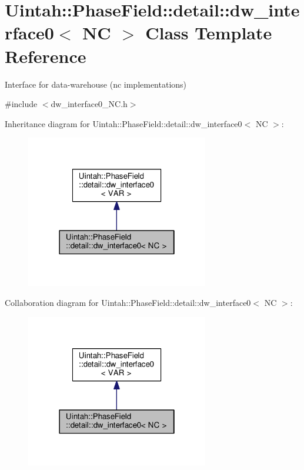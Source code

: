 \hypertarget{classUintah_1_1PhaseField_1_1detail_1_1dw__interface0_3_01NC_01_4}{}\section{Uintah\+:\+:Phase\+Field\+:\+:detail\+:\+:dw\+\_\+interface0$<$ NC $>$ Class Template Reference}
\label{classUintah_1_1PhaseField_1_1detail_1_1dw__interface0_3_01NC_01_4}


Interface for data-\/warehouse (nc implementations)  




{\ttfamily \#include $<$dw\+\_\+interface0\+\_\+\+N\+C.\+h$>$}



Inheritance diagram for Uintah\+:\+:Phase\+Field\+:\+:detail\+:\+:dw\+\_\+interface0$<$ NC $>$\+:\nopagebreak
\begin{figure}[H]
\begin{center}
\leavevmode
\includegraphics[width=226pt]{classUintah_1_1PhaseField_1_1detail_1_1dw__interface0_3_01NC_01_4__inherit__graph}
\end{center}
\end{figure}


Collaboration diagram for Uintah\+:\+:Phase\+Field\+:\+:detail\+:\+:dw\+\_\+interface0$<$ NC $>$\+:\nopagebreak
\begin{figure}[H]
\begin{center}
\leavevmode
\includegraphics[width=226pt]{classUintah_1_1PhaseField_1_1detail_1_1dw__interface0_3_01NC_01_4__coll__graph}
\end{center}
\end{figure}
